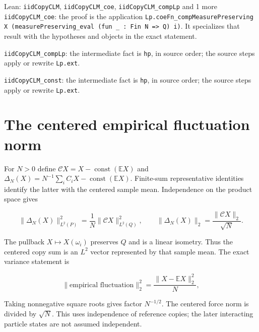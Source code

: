 \documentclass[11pt,a4paper]{article}
\begin{document}
\begin{leanbox}{Lean: \texttt{iidCopyCLM}, \texttt{iidCopyCLM\_\allowbreak{}coe}, \texttt{iidCopyCLM\_\allowbreak{}compLp} and 1 more}
\texttt{iid\allowbreak{}Copy\allowbreak{}CLM\_\allowbreak{}coe}: the proof is the application \texttt{Lp.\allowbreak{}coe\allowbreak{}Fn\_\allowbreak{}comp\allowbreak{}Measure\allowbreak{}Preserving X (measure\allowbreak{}Preserving\_\allowbreak{}eval (fun \_\allowbreak{} : Fin N => Q) i)}. It specializes that result with the hypotheses and objects in the exact statement.



\texttt{iid\allowbreak{}Copy\allowbreak{}CLM\_\allowbreak{}comp\allowbreak{}Lp}: the intermediate fact is \texttt{hp}, in source order; the source steps apply or rewrite \texttt{Lp.\allowbreak{}ext}.



\texttt{iid\allowbreak{}Copy\allowbreak{}CLM\_\allowbreak{}const}: the intermediate fact is \texttt{hp}, in source order; the source steps apply or rewrite \texttt{Lp.\allowbreak{}ext}.
\end{leanbox}

\section{\texorpdfstring{The centered empirical fluctuation norm}{The centered empirical fluctuation norm}}


For \(N>0\) define \(\mathcal C X=X-\operatorname{const}(\mathbb EX)\) and \(\Delta_N(X)=N^{-1}\sum_iC_iX-\operatorname{const}(\mathbb EX)\). Finite-sum representative identities identify the latter with the centered sample mean. Independence on the product space gives

\[\|\Delta_N(X)\|_{L^2(P)}^2=\frac1N\|\mathcal C X\|_{L^2(Q)}^2,\qquad\|\Delta_N(X)\|_2=\frac{\|\mathcal C X\|_2}{\sqrt N}.\]

The pullback \(X\mapsto X(\omega_i)\) preserves \(Q\) and is a linear isometry. Thus the centered copy sum is an \(L^2\) vector represented by that sample mean. The exact variance statement is

\[\|\text{empirical fluctuation}\|_2^2=\frac{\|X-\mathbb EX\|_2^2}{N},\]

Taking nonnegative square roots gives factor \(N^{-1/2}\). The centered force norm is divided by \(\sqrt N\). This uses independence of reference copies; the later interacting particle states are not assumed independent.
\end{document}
